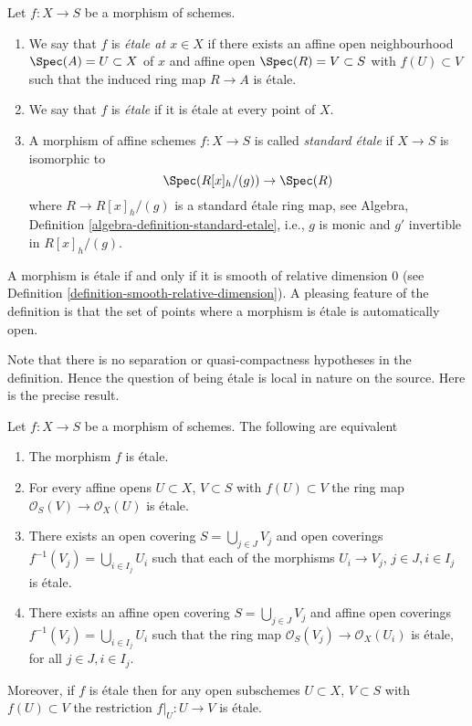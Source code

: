 \begin{definition}
\label{definition-etale}
Let $f : X \to S$ be a morphism of schemes.
\begin{enumerate}
\item We say that $f$ is {\it \'etale at $x \in X$} if
there exists an affine open neighbourhood $\Spec(A) = U \subset X$
of $x$ and affine open $\Spec(R) = V \subset S$
with $f(U) \subset V$ such that the induced ring map
$R \to A$ is \'etale.
\item We say that $f$ is {\it \'etale} if it is \'etale at every point of $X$.
\item A morphism of affine schemes $f : X \to S$ is called
{\it standard \'etale} if $X \to S$ is isomorphic to
$$
\Spec(R[x]_h/(g)) \to \Spec(R)
$$
where $R \to R[x]_h/(g)$ is a standard \'etale ring map, see
Algebra, Definition \ref{algebra-definition-standard-etale},
i.e., $g$ is monic and $g'$ invertible in $R[x]_h/(g)$.
\end{enumerate}
\end{definition}

\noindent
A morphism is \'etale if and only if it is smooth of relative dimension $0$
(see Definition \ref{definition-smooth-relative-dimension}).
A pleasing feature of the definition is that the set of points
where a morphism is \'etale is automatically open.

\medskip\noindent
Note that there is no separation or quasi-compactness hypotheses in the
definition. Hence the question of being \'etale is local in nature on
the source. Here is the precise result.

\begin{lemma}
\label{lemma-etale-characterize}
Let $f : X \to S$ be a morphism of schemes.
The following are equivalent
\begin{enumerate}
\item The morphism $f$ is \'etale.
\item For every affine opens $U \subset X$, $V \subset S$
with $f(U) \subset V$ the ring map
$\mathcal{O}_S(V) \to \mathcal{O}_X(U)$ is \'etale.
\item There exists an open covering $S = \bigcup_{j \in J} V_j$
and open coverings $f^{-1}(V_j) = \bigcup_{i \in I_j} U_i$ such
that each of the morphisms $U_i \to V_j$, $j\in J, i\in I_j$
is \'etale.
\item There exists an affine open covering $S = \bigcup_{j \in J} V_j$
and affine open coverings $f^{-1}(V_j) = \bigcup_{i \in I_j} U_i$ such
that the ring map $\mathcal{O}_S(V_j) \to \mathcal{O}_X(U_i)$ is
\'etale, for all $j\in J, i\in I_j$.
\end{enumerate}
Moreover, if $f$ is \'etale then for
any open subschemes $U \subset X$, $V \subset S$ with $f(U) \subset V$
the restriction $f|_U : U \to V$ is \'etale.
\end{lemma}

